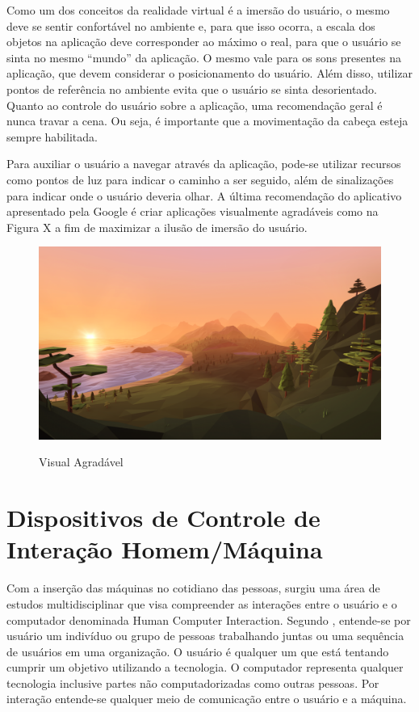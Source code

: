 Como um dos conceitos da realidade virtual é a imersão do usuário, o mesmo deve se sentir confortável no ambiente e, para que isso ocorra, a escala dos objetos na aplicação deve corresponder ao máximo o real, para que o usuário se sinta no mesmo “mundo” da aplicação. O mesmo vale para os sons presentes na aplicação, que devem considerar o posicionamento do usuário. Além disso, utilizar pontos de referência no ambiente evita que o usuário se sinta desorientado. Quanto ao controle do usuário sobre a aplicação, uma recomendação geral é nunca travar a cena. Ou seja, é importante que a movimentação da cabeça esteja sempre habilitada.

Para auxiliar o usuário a navegar através da aplicação, pode-se utilizar recursos como pontos de luz para indicar o caminho a ser seguido, além de sinalizações para indicar onde o usuário deveria olhar. A última recomendação do aplicativo apresentado pela Google é criar aplicações visualmente agradáveis como na Figura X a fim de maximizar a ilusão de imersão do usuário. 

\begin{figure}[h]
	\caption{\small Visual Agradável}
	\centering
	\includegraphics[scale=0.2]{Imagens/makeitbeautiful.png}
	\label{f.makeitbeatiful}
\end{figure}


\section{Dispositivos de Controle de Interação Homem/Máquina}
\label{s.dispositivos}

Com a inserção das máquinas no cotidiano das pessoas, surgiu uma área de estudos multidisciplinar que visa compreender as interações entre o usuário e o computador denominada Human Computer Interaction. Segundo , entende-se por usuário um indivíduo ou grupo de pessoas trabalhando juntas ou uma sequência de usuários em uma organização. O usuário é qualquer um que está tentando cumprir um objetivo utilizando a tecnologia. O computador representa qualquer tecnologia inclusive partes não computadorizadas como outras pessoas. Por interação entende-se qualquer meio de comunicação entre o usuário e a máquina.  

